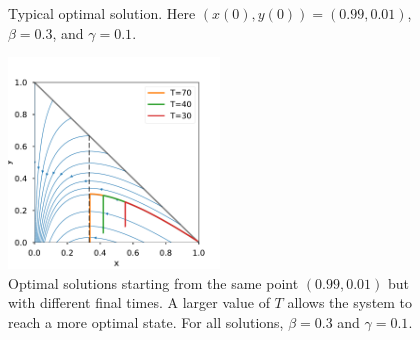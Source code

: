 \documentclass[english,12pt,letter]{article}
\begin{document}
\begin{figure}
    \centering
    \caption{Typical optimal solution.  Here $(x(0),y(0)) = (0.99,0.01)$, $\beta=0.3$, and $\gamma=0.1$.\label{fig:example1}}
\end{figure}

\begin{figure}
    \centering
    \includegraphics[width=0.5\textwidth]{figures/diff-time-opt.pdf}
    \caption{Optimal solutions starting from the same point $(0.99,0.01)$ but with different
        final times.  A larger value of $T$ allows the system to reach a more optimal state.
        For all solutions, $\beta=0.3$ and $\gamma=0.1$.\label{fig:diff-time-opt}}
\end{figure}
\end{document}
